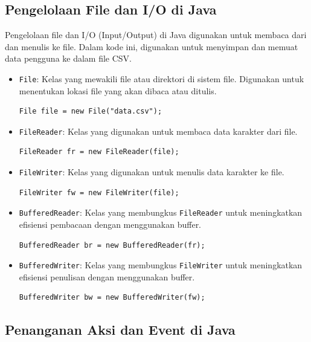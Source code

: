 \subsection{Pengelolaan File dan I/O di Java}

Pengelolaan file dan I/O (Input/Output) di Java digunakan untuk membaca dari dan menulis ke file. Dalam kode ini, digunakan untuk menyimpan dan memuat data pengguna ke dalam file CSV.

\begin{itemize}
\item \texttt{File}: Kelas yang mewakili file atau direktori di sistem file. Digunakan untuk menentukan lokasi file yang akan dibaca atau ditulis.
\begin{lstlisting}[style=JavaStyle]
	File file = new File("data.csv");
\end{lstlisting}

\item \texttt{FileReader}: Kelas yang digunakan untuk membaca data karakter dari file.
\begin{lstlisting}[style=JavaStyle]
	FileReader fr = new FileReader(file);
\end{lstlisting}

\item \texttt{FileWriter}: Kelas yang digunakan untuk menulis data karakter ke file.
\begin{lstlisting}[style=JavaStyle]
	FileWriter fw = new FileWriter(file);
\end{lstlisting}

\item \texttt{BufferedReader}: Kelas yang membungkus \texttt{FileReader} untuk meningkatkan efisiensi pembacaan dengan menggunakan buffer.
\begin{lstlisting}[style=JavaStyle]
	BufferedReader br = new BufferedReader(fr);
\end{lstlisting}

\item \texttt{BufferedWriter}: Kelas yang membungkus \texttt{FileWriter} untuk meningkatkan efisiensi penulisan dengan menggunakan buffer.
\begin{lstlisting}[style=JavaStyle]
	BufferedWriter bw = new BufferedWriter(fw);
\end{lstlisting}
\end{itemize}

\subsection{Penanganan Aksi dan Event di Java}

